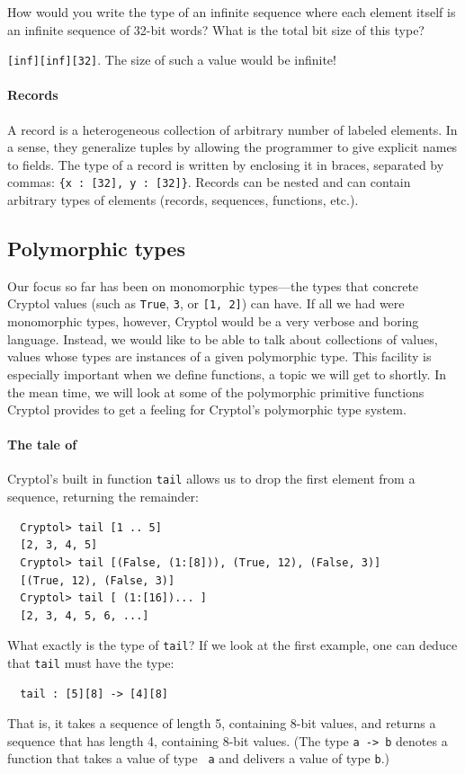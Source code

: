\begin{Exercise}\label{ex:types:2}
  How would you write the type of an infinite sequence where each
  element itself is an infinite sequence of 32-bit words? What is the
  total bit size of this type?
\end{Exercise}
\begin{Answer} {\tt [inf][inf][32]}. The size of
  such a value would be infinite!
\end{Answer}

\paragraph{Records}\indTheRecordType
A record is a heterogeneous collection of arbitrary number of labeled
elements.  In a sense, they generalize tuples by allowing the
programmer to give explicit names to fields. The type of a record is
written by enclosing it in braces, separated by commas:
\texttt{\{x :\ [32], y :\ [32]\}}. Records can be nested and can contain arbitrary
types of elements (records, sequences, functions, etc.).

\subsection{Polymorphic types}\indPolymorphism
\label{sec:polymorphic-types}

Our focus so far has been on monomorphic types---the types that
concrete Cryptol values (such as {\tt True}, {\tt 3}, or {\tt [1, 2]})
can have.  If all we had were monomorphic types, however, Cryptol
would be a very verbose and boring language.  Instead, we would like
to be able to talk about collections of values, values whose types are
instances of a given polymorphic type. This facility is especially
important when we define functions, a topic we will get to shortly. In
the mean time, we will look at some of the polymorphic primitive
functions Cryptol provides to get a feeling for Cryptol's polymorphic
type system.

\paragraph{The tale of {}}\indTail
Cryptol's built in function {\tt tail} allows us to drop the first
element from a sequence, returning the remainder:
\begin{Verbatim}
  Cryptol> tail [1 .. 5]
  [2, 3, 4, 5]
  Cryptol> tail [(False, (1:[8])), (True, 12), (False, 3)]
  [(True, 12), (False, 3)]
  Cryptol> tail [ (1:[16])... ]
  [2, 3, 4, 5, 6, ...]
\end{Verbatim}
What exactly is the type of {\tt tail}? If we look at the first
example, one can deduce that {\tt tail} must have the type:
\begin{Verbatim}
  tail : [5][8] -> [4][8]
\end{Verbatim}
That is, it takes a sequence of length 5, containing 8-bit values, and
returns a sequence that has length 4, containing 8-bit values. (The
type {\tt a -> b} denotes a function that takes a value of type {\tt
  a} and delivers a value of type {\tt b}.)

